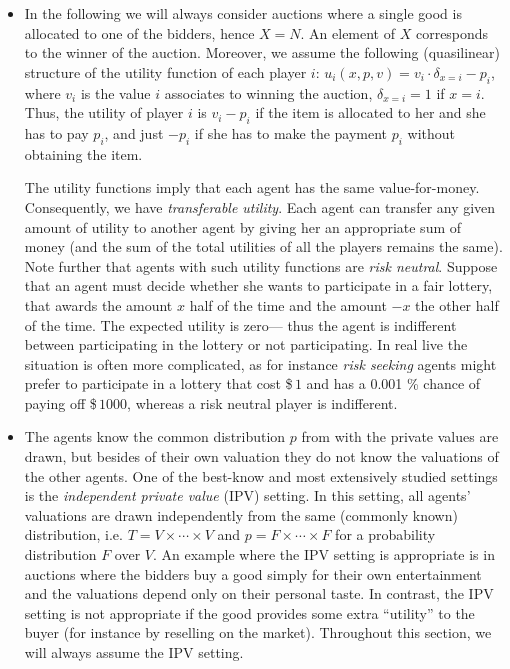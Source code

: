 \begin{itemize}
\item In the following we will always consider auctions where a single good is allocated to one of the bidders, hence $X=N$. An element of $X$ corresponds to the winner of the auction. Moreover, we assume the following (quasilinear) structure of the utility function of each player $i$: $u_i(x,p,v) = v_i \cdot \delta_{x = i} - p_i$, where $v_i$ is the value $i$ associates to winning the auction, $\delta_{x = i} = 1$ if $x = i$. Thus, the utility of player $i$ is $v_i - p_i$ if the item is allocated to her and she has to pay $p_i$, and just $-p_i$ if she has to make the payment $p_i$ without obtaining the item.

The utility functions imply that each agent has the same value-for-money. Consequently, we have \emph{transferable utility}. Each agent can transfer any given amount of utility to another agent by giving her an appropriate sum of money (and the sum of the total utilities of all the players remains the same).
Note further that agents with such utility functions are \emph{risk neutral}. Suppose that an agent must decide whether she wants to participate in a fair lottery, that awards the amount $x$ half of the time and the amount $-x$ the other half of the time. The expected utility is zero--- thus the agent is indifferent between participating in the lottery or not participating. In real live the situation is often more complicated, as for instance \emph{risk seeking} agents might prefer to participate in a lottery that cost \$\,$1$ and has a 0.001 \% chance of paying off \$\,$1000$, whereas a risk neutral player is indifferent.
\item The agents know the common distribution $p$ from with the private values are drawn, but besides of their own valuation they do not know the valuations of the other agents. One of the best-know and most extensively studied settings is the \emph{independent private value} (IPV) setting. In this setting, all agents' valuations are drawn independently from the same (commonly known) distribution, i.e. $T = V \times \cdots \times V$ and $p = F \times \cdots \times F$ for a probability distribution $F$ over $V$. An example where the IPV setting is appropriate is in auctions where the bidders buy a good simply for their own entertainment and the valuations depend only on their personal taste. In contrast, the IPV setting is not appropriate if the good provides some extra ``utility'' to the buyer (for instance by reselling on the market).  Throughout this section, we will always assume the IPV setting.
\end{itemize}

